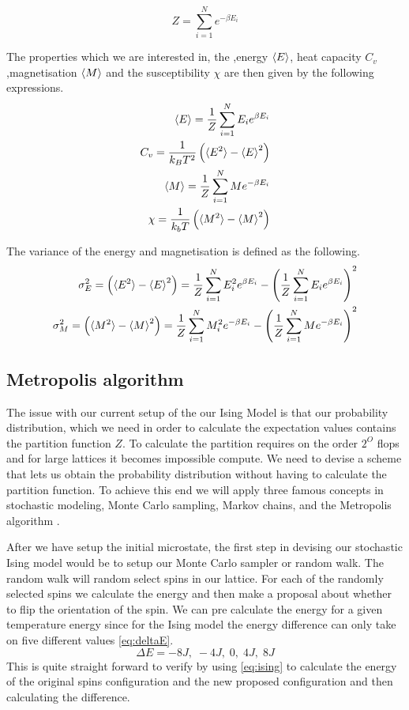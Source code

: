 \begin{equation}\label{eq:partFunc}
  Z = \sum_{i=1}^{N} e^{-\beta E_i}
\end{equation}

The properties which we are interested in, the ,energy $\braket{E}$, heat
capacity $C_v$,magnetisation $\braket{M}$ and the susceptibility $\chi$ are then given 
by the following expressions. 
\begin{eqnarray}
  \braket{E} = \frac{1}{Z} \sum_{i=1}^N E_i e^{\beta E_i} \\ 
  C_v = \frac{1}{k_B T^2}\left(\braket{E^2} - \braket{E}^2 \right) \\
  \braket{M} = \frac{1}{Z} \sum_{i=1}^{N} M e^{-\beta E_i} \\
  \chi = \frac{1}{k_b T}\left(\braket{M^2}- \braket{M}^2\right)
\end{eqnarray}

The variance of the energy and magnetisation is defined as the following.
\begin{eqnarray}
  \sigma_E^{2} = \left(\braket{E^2} - \braket{E}^2 \right) = \frac{1}{Z}
  \sum_{i=1}^N E_i^2 e^{\beta E_i} - \left(\frac{1}{Z} \sum_{i=1}^N E_i e^{\beta
  E_i}\right)^2  \\
  \sigma_M^{2} = \left(\braket{M^2}- \braket{M}^2\right) = \frac{1}{Z} \sum_{i=1}^{N} M_i^2 e^{-\beta E_i}  - \left(\frac{1}{Z} \sum_{i=1}^{N} M e^{-\beta E_i}  \right)^2
\end{eqnarray}


\subsection{Metropolis algorithm}
The issue with our current setup of the our Ising Model is that our probability
distribution, which we need in order to calculate the expectation values
contains the partition function $Z$. To calculate the partition requires on the
order $2^{O}$ flops and
for large lattices it becomes impossible compute. We need to devise a scheme
that lets us obtain the probability distribution without having to calculate the
partition function. To achieve this end we will apply three famous concepts in
stochastic modeling, Monte Carlo sampling, Markov chains, and the Metropolis
algorithm .

After we have setup the initial microstate, the first step in devising our stochastic Ising model would be to setup our
Monte Carlo sampler or random walk. The random walk will random select spins in
our lattice. For each of the randomly selected spins we calculate the energy and
then make a proposal about whether to flip the orientation of the spin. We can
pre calculate the energy for a given temperature energy since for the Ising
model the energy difference can only take on five different values \cref{eq:deltaE}.
\begin{equation}\label{eq:deltaE}
  \Delta E = -8J, \; -4J, \; 0, \; 4J, \; 8J
\end{equation}
This is quite straight forward to verify by using \cref{eq:ising} to calculate
the energy of the original spins configuration and the new proposed
configuration and then calculating the difference.  

